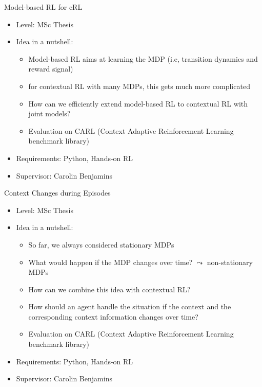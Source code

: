 \documentclass[aspectratio=169]{../latex_main/tntbeamer}  %
\begin{document}
\begin{frame}[c]{Model-based RL for cRL}
	
    \begin{itemize}
		\item Level: MSc Thesis
		\item Idea in a nutshell:
		\begin{itemize}
		    \item Model-based RL aims at learning the MDP (i.e, transition dynamics and reward signal)
		    \item for contextual RL with many MDPs, this gets much more complicated
		    \item How can we efficiently extend model-based RL to contextual RL  with joint models?
		    \item Evaluation on CARL (Context Adaptive Reinforcement Learning benchmark library)
		\end{itemize}
		\item Requirements: Python, Hands-on RL
		\item Supervisor: Carolin Benjamins
	\end{itemize}
	
\end{frame}
\begin{frame}[c]{Context Changes during Episodes}
	
    \begin{itemize}
		\item Level: MSc Thesis
		\item Idea in a nutshell:
		\begin{itemize}
		    \item So far, we always considered stationary MDPs 
		    \item What would happen if the MDP changes over time? $\leadsto$ non-stationary MDPs 
		    \item How can we combine this idea with contextual RL? 
		    \item How should an agent handle the situation if the context and the corresponding context information changes over time?
		    \item Evaluation on CARL (Context Adaptive Reinforcement Learning benchmark library)
		\end{itemize}
		\item Requirements: Python, Hands-on RL
		\item Supervisor: Carolin Benjamins
	\end{itemize}
	
\end{frame}
\end{document}
